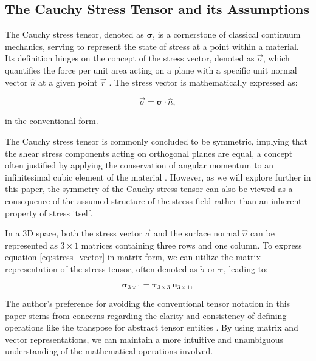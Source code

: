 \documentclass[12pt,a4paper,english]{article}
\begin{document}
\subsection{The Cauchy Stress Tensor and its Assumptions} %

The Cauchy stress tensor, denoted as $\boldsymbol{\sigma}$, is a cornerstone of classical continuum mechanics, serving to represent the state of stress at a point within a material. Its definition hinges on the concept of the stress vector, denoted as $\vec{\sigma}$, which quantifies the force per unit area acting on a plane with a specific unit normal vector $\hat{n}$ at a given point $\vec{r}$ \cite{truesdell2004non}. The stress vector is mathematically expressed as:

\begin{equation}\label{eq:stress_vector}
\vec{\sigma} = \boldsymbol{\sigma} \cdot \hat{n},
\end{equation}

\noindent
in the conventional form.

The Cauchy stress tensor is commonly concluded to be symmetric, implying that the shear stress components acting on orthogonal planes are equal, a concept often justified by applying the conservation of angular momentum to an infinitesimal cubic element of the material \cite{marsden1994mathematical}. However, as we will explore further in this paper, the symmetry of the Cauchy stress tensor can also be viewed as a consequence of the assumed structure of the stress field rather than an inherent property of stress itself. %

In a 3D space, both the stress vector $\vec{\sigma}$ and the surface normal $\hat{n}$ can be represented as $3 \times 1$ matrices containing three rows and one column. To express equation \ref{eq:stress_vector} in matrix form, we can utilize the matrix representation of the stress tensor, often denoted as $\check{\sigma}$ or $\mathbf{\tau}$, leading to:

\begin{equation}\label{eq:matrix_form}
\mathbf{\sigma}_{3 \times 1} = \mathbf{\tau}_{3 \times 3} \, \mathbf{n}_{3 \times 1},
\end{equation}

The author's preference for avoiding the conventional tensor notation in this paper stems from concerns regarding the clarity and consistency of defining operations like the transpose for abstract tensor entities \cite{farimani2018mathstackexchange}. By using matrix and vector representations, we can maintain a more intuitive and unambiguous understanding of the mathematical operations involved.
\end{document}

